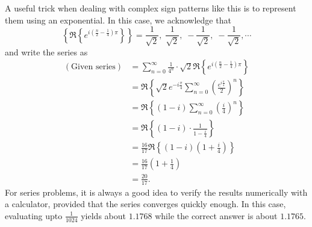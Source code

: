 \item

A useful trick when dealing with complex sign patterns like this is to represent them using an exponential.
In this case, we acknowledge that
\[
	\left\{ \Re \left\{ e^{i\left( \frac{n}{2} - \frac{1}{4} \right) \pi} \right\} \right\}
	= \frac{1}{\sqrt{2}},\; \frac{1}{\sqrt{2}},\; -\frac{1}{\sqrt{2}},\; -\frac{1}{\sqrt{2}}, \cdots
\]
and write the series as
\begin{align*}
	(\text{Given series})
	&= \sum_{n=0}^\infty \frac{1}{4^n} \cdot \sqrt{2} \Re \left\{ e^{i\left( \frac{n}{2} - \frac{1}{4} \right) \pi} \right\} \\
	&= \Re \left\{ \sqrt{2} e^{-i\frac{\pi}{4}} \sum_{n=0}^\infty {\left( \frac{e^{i\frac{\pi}{4}}}{2} \right)}^n \right\} \\
	&= \Re \left\{ (1 - i) \sum_{n=0}^\infty {\left( \frac{i}{4} \right)}^n \right\} \\
	&= \Re \left\{ (1 - i) \cdot \frac{1}{1 - \frac{i}{4}} \right\} \\
	&= \frac{16}{17} \Re \left\{ (1 - i) \left( 1 + \frac{i}{4} \right) \right\} \\
	&= \frac{16}{17} \left( 1 + \frac{1}{4} \right) \\
	&= \frac{20}{17}.
\end{align*}
For series problems, it is always a good idea to verify the results numerically with a calculator, provided that the series converges quickly enough.
In this case, evaluating upto $\frac{1}{1024}$ yields about $1.1768$ while the correct answer is about $1.1765$.